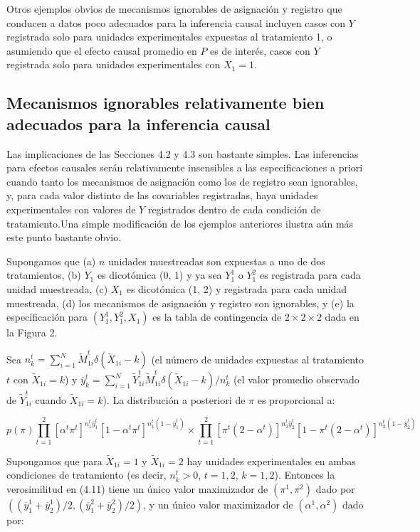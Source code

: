 \documentclass[12pt,a4paper]{article}
\begin{document}
Otros ejemplos obvios de mecanismos ignorables de asignación y registro que conducen a datos poco adecuados para la inferencia causal incluyen casos con $Y$ registrada solo para unidades experimentales expuestas al tratamiento 1, o asumiendo que el efecto causal promedio en $P$ es de interés, casos con $Y$ registrada solo para unidades experimentales con $X_1=1$. 

\subsection{Mecanismos ignorables relativamente bien adecuados para la inferencia causal} 

Las implicaciones de las Secciones 4.2 y 4.3 son bastante simples. Las inferencias para efectos causales serán relativamente insensibles a las especificaciones a priori cuando tanto los mecanismos de asignación como los de registro sean ignorables, y, para cada valor distinto de las covariables registradas, haya unidades experimentales con valores de $Y$ registrados dentro de cada condición de tratamiento.Una simple modificación de los ejemplos anteriores ilustra aún más este punto bastante obvio. 

Supongamos que (a) $n$ unidades muestreadas son expuestas a uno de dos tratamientos, (b) $Y_1$ es dicotómica (0, 1) y ya sea $Y_1^1$ o $Y_1^2$ es registrada para cada unidad muestreada, (c) $X_1$ es dicotómica (1, 2) y registrada para cada unidad muestreada, (d) los mecanismos de asignación y registro son ignorables, y (e) la especificación para $(Y_1^1, Y_1^2, X_1)$ es la tabla de contingencia de $2 \times 2 \times 2$ dada en la Figura 2. 

Sea $n_k^t = \sum_{i=1}^N \tilde{M}_{1i}^t \delta(\tilde{X}_{1i}-k)$ (el número de unidades expuestas al tratamiento $t$ con $\tilde{X}_{1i}=k$) y $\overline{y}_k^t = \sum_{i=1}^N \tilde{Y}_{1i}^t \tilde{M}_{1i}^t \delta(\tilde{X}_{1i}-k) / n_k^t$ (el valor promedio observado de $\tilde{Y}_{1i}^t$ cuando $\tilde{X}_{1i}=k$). La distribución a posteriori de $\pi$ es proporcional a: 

\begin{equation}\label{eq:4.11}
p(\pi) \prod_{t=1}^2 [\alpha^t \pi^t]^{n_1^t \overline{y}_1^t} [1-\alpha^t \pi^t]^{n_1^t(1-\overline{y}_1^t)} \times \prod_{t=1}^2 [\pi^t(2-\alpha^t)]^{n_2^t \overline{y}_2^t} [1-\pi^t(2-\alpha^t)]^{n_2^t(1-\overline{y}_2^t)} \tag{4.11}
\end{equation} 

Supongamos que para $\tilde{X}_{1i}=1$ y $\tilde{X}_{1i}=2$ hay unidades experimentales en ambas condiciones de tratamiento (es decir, $n_k^t > 0$, $t=1, 2$, $k=1, 2$). Entonces la verosimilitud en (4.11) tiene un único valor maximizador de $(\pi^1, \pi^2)$ dado por $((\overline{y}_1^1 + \overline{y}_2^1)/2, (\overline{y}_1^2 + \overline{y}_2^2)/2)$, y un único valor maximizador de $(\alpha^1, \alpha^2)$ dado por:
\end{document}
